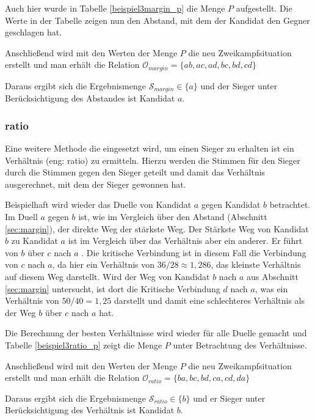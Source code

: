Auch hier wurde in Tabelle \ref{beispiel3margin_p} die Menge $P$ aufgestellt. Die Werte in der Tabelle zeigen nun den Abstand, mit dem der Kandidat den Gegner geschlagen hat.

\newpage


Anschließend wird mit den Werten der Menge $P$ die neu Zweikampfsituation erstellt und man erhält die Relation $\mathcal{O}_{margin} = \{ ab, ac,ad,bc,bd,cd \}$

Daraus ergibt sich die Ergebnismenge $\mathcal{S}_{margin} \in \{ a\}$ und der Sieger unter Berücksichtigung des Abstandes ist Kandidat $a$.

\subsubsection{ratio}
\label{sec:ratio}
Eine weitere Methode die eingesetzt wird, um einen Sieger zu erhalten ist ein Verhältnis (eng: ratio) zu ermitteln. Hierzu werden die Stimmen für den Sieger durch die Stimmen gegen den Sieger geteilt und damit das Verhältnis ausgerechnet, mit dem der Sieger gewonnen hat.

Beispielhaft wird wieder das Duelle von Kandidat $a$ gegen Kandidat $b$ betrachtet. Im Duell $a$ gegen $b$ ist, wie im Vergleich über den Abstand (Abschnitt \ref{sec:margin}), der direkte Weg der stärkste Weg. Der Stärkste Weg von Kandidat $b$ zu Kandidat $a$ ist im Vergleich über das Verhältnis aber ein anderer. Er führt von $b$ über $c$ nach $a$ . Die kritische Verbindung ist in diesem Fall die Verbindung von $c$ nach $a$, da hier ein Verhältnis von $36/28 \approx 1,286$, das kleinste Verhältnis auf diesem Weg darstellt. Wird der Weg von Kandidat $b$ nach $a$ aus Abschnitt \ref{sec:margin} untersucht, ist dort die Kritische Verbindung $d$ nach $a$, was ein Verhältnis von $ 50/40 = 1,25$ darstellt und damit eine schlechteres Verhältnis als der Weg $b$ über $c$ nach $a$ hat.

Die Berechnung der besten Verhältnisse wird wieder für alle Duelle gemacht und  Tabelle \ref{beispiel3ratio_p} zeigt die Menge $P$ unter Betrachtung des Verhältnisse.



Anschließend wird mit den Werten der Menge $P$ die neu Zweikampfsituation erstellt und man erhält die Relation $\mathcal{O}_{ratio} = \{ ba,bc,bd,ca,cd,da \}$

Daraus ergibt sich die Ergebnismenge $\mathcal{S}_{ratio} \in \{ b\}$ und er Sieger unter Berücksichtigung des Verhältnis ist Kandidat $b$.

